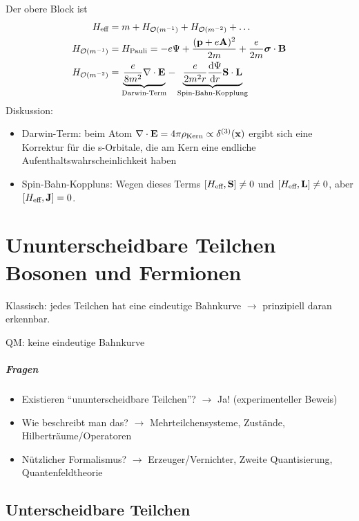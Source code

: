 \documentclass[11pt,a4paper]{report}
\renewcommand{\vec}{\boldsymbol}
\begin{document}
Der obere Block ist 
\begin{align*}
    H_{\text{eff}} &= m + H_{\mathcal{O}(m^{-1})} + H_{\mathcal{O}(m^{-2})} + \ldots \\
    H_{\mathcal{O}(m^{-1})} &= H_{\text{Pauli}} = -e \Psi + \frac{(\vf{p} + e \vf{A})^2}{2 m} + \frac{e}{2m}\vec{\sigma}\cdot \vf{B} \\
    H_{\mathcal{O}(m^{-2})} &= \underbrace{\frac{e}{8m^2}\nabla\cdot \vf{E}}_{\text{Darwin-Term}} - \underbrace{\frac{e}{2m^2 r} \frac{\mathrm{d}\Psi}{\mathrm{d}r} \vf{S}\cdot \vf{L}}_{\text{Spin-Bahn-Kopplung}}
\end{align*}
Diskussion:
\begin{itemize}
    \item Darwin-Term: beim Atom $\nabla\cdot\mathbf{E} = 4\pi \rho_{\text{Kern}} \propto \delta^{(3)}(\mathbf{x})$ ergibt sich eine Korrektur für die s-Orbitale, die am Kern eine endliche Aufenthaltswahrscheinlichkeit haben
    \item Spin-Bahn-Koppluns: Wegen dieses Terms $[H_{\text{eff}}, \mathbf{S}] \neq 0$ und $[H_{\text{eff}}, \mathbf{L}] \neq 0$, aber $[H_{\text{eff}}, \mathbf{J}] = 0$.
\end{itemize}

\chapter{Ununterscheidbare Teilchen\\ \Large{Bosonen und Fermionen}}

Klassisch: jedes Teilchen hat eine eindeutige Bahnkurve $\rightarrow$ prinzipiell daran erkennbar.\par 

QM: keine eindeutige Bahnkurve

\paragraph{Fragen}
\begin{itemize}
\item Existieren ``ununterscheidbare Teilchen''? $\rightarrow$ Ja! (experimenteller Beweis)
\item Wie beschreibt man das? $\rightarrow$ Mehrteilchensysteme, Zustände, Hilberträume/Operatoren
\item Nützlicher Formalismus? $\rightarrow$ Erzeuger/Vernichter, Zweite Quantisierung, Quantenfeldtheorie
\end{itemize}

\section{Unterscheidbare Teilchen}
\end{document}
